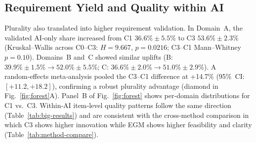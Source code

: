\documentclass[acmsmall]{acmart}
\begin{document}
\subsection{Requirement Yield and Quality within AI}
Plurality also translated into higher requirement validation. In Domain~A, the validated AI‑only share increased from C1 $36.6\%\pm5.5\%$ to C3 $53.6\%\pm2.3\%$ (Kruskal–Wallis across C0--C3: $H{=}9.667$, $p{=}0.0216$; C3--C1 Mann–Whitney $p{=}0.10$). Domains~B and~C showed similar uplifts (B: $39.9\%\pm1.5\%\rightarrow52.0\%\pm5.5\%$; C: $36.6\%\pm2.0\%\rightarrow51.0\%\pm2.9\%$). A random‑effects meta‑analysis pooled the C3--C1 difference at +14.7\% (95\%~CI: \([+11.2, +18.2]\)), confirming a robust plurality advantage (diamond in Fig.~\ref{fig:forest}A). Panel~B of Fig.~\ref{fig:forest} shows per‑domain distributions for C1 vs.\ C3. Within‑AI item‑level quality patterns follow the same direction (Table~\ref{tab:big-results}) and are consistent with the cross‑method comparison in which C3 shows higher innovation while EGM shows higher feasibility and clarity (Table~\ref{tab:method-compare}). 
\end{document}
